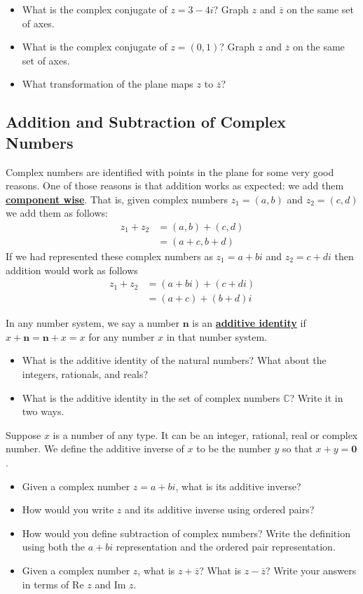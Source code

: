 \documentclass[11pt]{article}
\newenvironment{task}
	{\begin{mdframed}[linecolor=lightgray, linewidth=3pt]\raggedright}
	{\end{mdframed}}
\renewcommand\emph[1]{\underline{\bf{#1}}} %
\theoremstyle{definition}
\begin{document}
\begin{task}
  \begin{itemize}
    \item What is the complex conjugate of $z=3-4i$? Graph $z$ and $\overline{z}$ on the same set of axes. 
    \item What is the complex conjugate of $z=(0,1)$? Graph $z$ and $\overline{z}$ on the same set of axes.
    \item What transformation of the plane maps $z$ to $\overline{z}$?
  \end{itemize}
\end{task}

\subsection{Addition and Subtraction of Complex Numbers}

Complex numbers are identified with points in the plane for some very good reasons. One of those reasons is that addition works as expected: we
add them \emph{component wise}. That is, given complex numbers $z_1=(a,b)$ and $z_2 = (c,d)$ we add them as follows:
\begin{align*}
  z_1 + z_2 &= (a,b)+(c,d)\\
            &= (a+c, b+d)
\end{align*}
If we had represented these complex numbers as $z_1=a+bi$ and $z_2=c+di$ then addition would work as follows
\begin{align*}
  z_1 + z_2 &= (a+bi)+(c+di)\\
            &= (a+c) + (b+d)i
\end{align*}

\begin{task}
  In any number system, we say a number $\mathbf{n}$ is an \emph{additive identity} if $x + \mathbf{n} = \mathbf{n} + x = x$ for any number $x$ in that 
  number system.
  \begin{itemize}
    \item What is the additive identity of the natural numbers? What about the integers, rationals, and reals?
    \item What is the additive identity in the set of complex numbers $\mathbb{C}$? Write it in two ways.
  \end{itemize}
  Suppose $x$ is a number of any type. It can be an integer, rational, real or complex number. We define the additive inverse of $x$ to be the number $y$ so
  that $x+y = \textbf{0}$. 
\begin{itemize}
  \item Given a complex number $z = a+bi$, what is its additive inverse? 
  \item How would you write $z$ and its additive inverse using ordered pairs?
  \item How would you define subtraction of complex numbers? Write the definition using both the $a+bi$ representation and the ordered pair representation.
  \item Given a complex number $z$, what is $z+\overline{z}$? What is $z-\overline{z}$? Write your answers in terms of $\text{Re }z$ and $\text{Im }z$.
\end{itemize}
\end{task}
\end{document}
